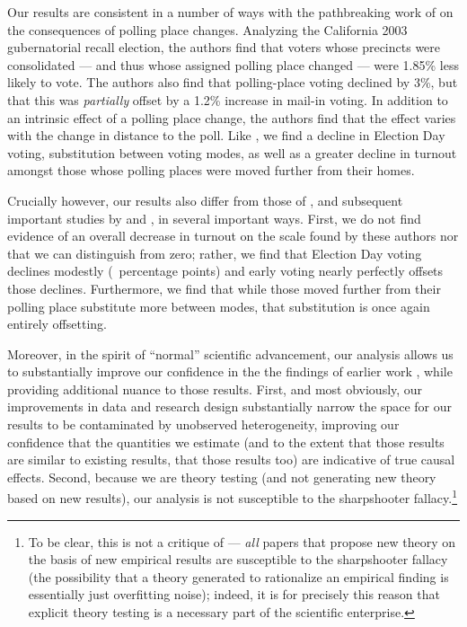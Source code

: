 \documentclass{cup_PSRM}
\begin{document}
Our results are consistent in a number of ways with the pathbreaking work of \cite{brady2011turning} on the consequences of polling place changes.  Analyzing the California 2003 gubernatorial recall election, the authors find that voters whose precincts were consolidated --- and thus whose assigned polling place changed --- were 1.85\% less likely to vote. The authors also find that polling-place voting declined by 3\%, but that this was \emph{partially} offset by a 1.2\% increase in mail-in voting. In addition to an intrinsic effect of a polling place change, the authors find that the effect varies with the change in distance to the poll.  Like \cite{brady2011turning}, we find a decline in Election Day voting, substitution between voting modes, as well as a greater decline in turnout amongst those whose polling places were moved further from their homes.

Crucially however, our results also differ from those of \cite{brady2011turning}, and subsequent important studies by \cite{amos2017reprecincting} and \cite{yoder2018}, in several important ways. First, we do not find evidence of an overall decrease in turnout on the scale found by these authors nor that we can distinguish from zero; rather, we find that Election Day voting declines modestly (\unskip~percentage points) and early voting nearly perfectly offsets those declines.  Furthermore, we find that while those moved further from their polling place substitute more between modes, that substitution is once again entirely offsetting.

Moreover, in the spirit of ``normal'' scientific advancement, our analysis allows us to substantially improve our confidence in the the findings of earlier work \citep{brady2011turning}, while providing additional nuance to those results. First, and most obviously, our improvements in data and research design substantially narrow the space for our results to be contaminated by unobserved heterogeneity, improving our confidence that the quantities we estimate (and to the extent that those results are similar to existing results, that those results too) are indicative of true causal effects. Second, because we are theory testing (and not generating new theory based on new results), our analysis is not susceptible to the sharpshooter fallacy.\footnote{To be clear, this is not a critique of \cite{brady2011turning} --- \emph{all} papers that propose new theory on the basis of new empirical results are susceptible to the sharpshooter fallacy (the possibility that a theory generated to rationalize an empirical finding is essentially just overfitting noise); indeed, it is for precisely this reason that explicit theory testing is a necessary part of the scientific enterprise.}
\end{document}
